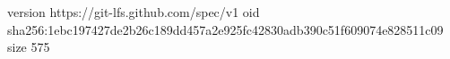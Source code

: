 version https://git-lfs.github.com/spec/v1
oid sha256:1ebc197427de2b26c189dd457a2e925fc42830adb390c51f609074e828511c09
size 575
